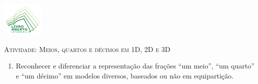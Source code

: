 \documentclass[10 pt,usenames,dvipsnames, oneside]{article}
\begin{document}
\begin{center}
  \begin{minipage}[l]{3cm}
\includegraphics[width=2cm]{logo}    
\end{minipage}\hfill
\begin{minipage}[r]{.8\textwidth}
 {\Large \scshape Atividade: Meios, quartos e décimos em 1D, 2D e 3D}  
\end{minipage}
\end{center}
\vspace{.2cm}

\ifdefined\prof
\begin{goals}
\begin{enumerate}

   \item Reconhecer e diferenciar a representação das frações ``um meio'', ``um quarto'' e       ``um décimo'' em modelos diversos, baseados  ou não em equipartição.


\end{enumerate}
\end{goals}
\end{document}
